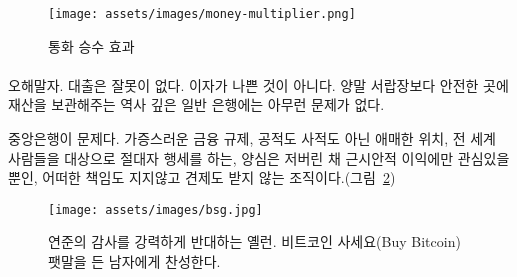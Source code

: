\begin{comment}
	\begin{figure}
		\centering
		\texttt{[image: assets/images/money-multiplier.png]}
		\caption{The money multiplier effect}
		\label{fig:money-multiplier}
	\end{figure}
\end{comment}
\begin{figure}
	\centering
	\texttt{[image: assets/images/money-multiplier.png]}
	\caption{통화 승수 효과}
	\label{fig:money-multiplier}
\end{figure}

\paragraph{}
\begin{comment}
	Don't get me wrong: There is nothing wrong with lending. There is
	nothing wrong with interest. There isn't even anything wrong with good
	old regular banks to store your wealth somewhere more secure than in
	your sock drawer.
\end{comment}
오해말자. 대출은 잘못이 없다. 이자가 나쁜 것이 아니다. 
양말 서랍장보다 안전한 곳에 재산을 보관해주는 역사 깊은 일반 은행에는 아무런 문제가 없다. 

\begin{comment}
	Central banks, however, are a different beast. Abominations of financial
	regulation, half public half private, playing god with something which
	affects everyone who is part of our global civilization, without a
	conscience, only interested in the immediate future, and seemingly
	without any accountability or auditability (see Figure~\ref{fig:bsg}).
\end{comment}
중앙은행이 문제다. 
가증스러운 금융 규제, 공적도 사적도 아닌 애매한 위치, 
전 세계 사람들을 대상으로 절대자 행세를 하는, 양심은 저버린 채 근시안적 이익에만 관심있을 뿐인, 
어떠한 책임도 지지않고 견제도 받지 않는 조직이다.(그림~\ref{fig:bsg})

\begin{comment}
	\begin{figure}
		\centering
		\texttt{[image: assets/images/bsg.jpg]}
		\caption{Yellen is strongly opposed to audit the Fed, while Bitcoin Sign Guy is strongly in favor of buying bitcoin.}
		\label{fig:bsg}
	\end{figure}
\end{comment}
\begin{figure}
	\centering
	\texttt{[image: assets/images/bsg.jpg]}
	\caption{연준의 감사를 강력하게 반대하는 옐런. 비트코인 사세요(Buy Bitcoin) 팻말을 든 남자에게 찬성한다.}
	\label{fig:bsg}
\end{figure}

